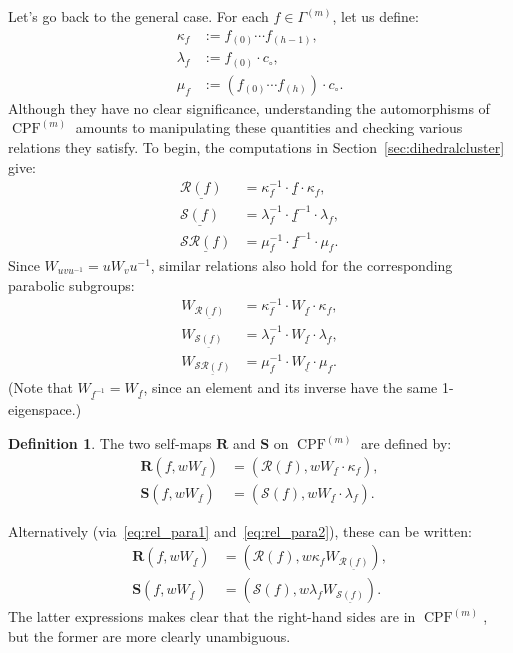 \documentclass[11pt]{article}
\theoremstyle{definition}
\newtheorem{defi}[theo]{Definition}
\newcommand{\RR}{\mathcal{R}}
\renewcommand{\SS}{\mathcal{S}}
\newcommand{\RRR}{\mathbf{R}}
\newcommand{\SSS}{\mathbf{S}}
\DeclareMathOperator{\CPF}{CPF}
\begin{document}
Let's go back to the general case.  For each $f\in \Gamma^{(m)}$, let us define:
\begin{align} 
    \label{eq:defkappa}
    \kappa_f & := f_{(0)} \cdots f_{(h-1)},  \\
    \label{eq:deflambda}
    \lambda_f & := f_{(0)} \cdot c_\circ, \\
    \label{eq:defmu}
    \mu_f & := (f_{(0)} \cdots f_{(h)}) \cdot c_\circ.
\end{align}
Although they have no clear significance, understanding the automorphisms of $\CPF^{(m)}$ amounts to manipulating these quantities and checking various relations they satisfy. To begin, the computations in Section~\ref{sec:dihedralcluster} give:
\begin{align}
    \underline{\RR(f)} &= \kappa_f^{-1} \cdot \underline{f} \cdot \kappa_f,\\
    \underline{\SS(f)} &= \lambda_f^{-1} \cdot \underline{f}^{-1} \cdot \lambda_f,\\
    \underline{\SS\RR(f)} &= \mu_f^{-1} \cdot \underline{f}^{-1} \cdot \mu_f.
\end{align}
Since $W_{u v u^{-1}} = u W_v u^{-1}$, similar relations also hold for the corresponding parabolic subgroups:
\begin{align} \label{eq:rel_para1}
    W_{\underline{\RR(f)}} &= \kappa_f^{-1} \cdot W_{\underline{f}} \cdot \kappa_f,\\
    \label{eq:rel_para2}
    W_{\underline{\SS(f)}} &= \lambda_f^{-1} \cdot W_{\underline{f}} \cdot \lambda_f,\\
    \label{eq:rel_para3}
    W_{\underline{\SS\RR(f)}} &= \mu_f^{-1} \cdot W_{\underline{f}} \cdot \mu_f.
\end{align}
(Note that $W_{\underline{f}^{-1}} = W_{\underline{f}}$, since an element and its inverse have the same 1-eigenspace.)

\begin{defi}
    The two self-maps $\RRR$ and $\SSS$ on $\CPF^{(m)}$ are defined by:
\begin{align} \label{eq:defRRR}
    \RRR(f,wW_{\underline{f}}) 
    &= (\RR(f),wW_{\underline{f}}\cdot \kappa_f), \\
    \label{eq:defSSS}
    \SSS(f,wW_{\underline{f}}) 
    &= (\SS(f),wW_{\underline{f}}\cdot \lambda_f).
\end{align}
\end{defi}

Alternatively (via~\eqref{eq:rel_para1} and~\eqref{eq:rel_para2}), these can be written:
\begin{align} \label{eq:defRRR2}
    \RRR(f,wW_{\underline{f}}) 
    &= (\RR(f),w \kappa_f W_{\underline{\RR(f)}}), \\
    \label{eq:defSSS2}
    \SSS(f,wW_{\underline{f}}) 
    &= (\SS(f),w \lambda_f W_{\underline{\SS(f)}}).
\end{align}
The latter expressions makes clear that the right-hand sides are in $\CPF^{(m)}$, but the former are more clearly unambiguous.
\end{document}
